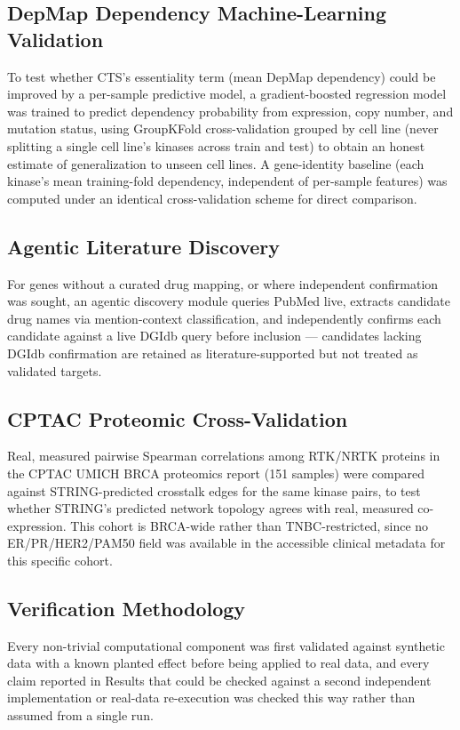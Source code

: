 \documentclass[10pt,letterpaper]{article}
\begin{document}
\subsection*{DepMap Dependency Machine-Learning Validation}
To test whether CTS's essentiality term (mean DepMap dependency) could be improved by a per-sample predictive model, a gradient-boosted regression model was trained to predict dependency probability from expression, copy number, and mutation status, using GroupKFold cross-validation grouped by cell line (never splitting a single cell line's kinases across train and test) to obtain an honest estimate of generalization to unseen cell lines. A gene-identity baseline (each kinase's mean training-fold dependency, independent of per-sample features) was computed under an identical cross-validation scheme for direct comparison.

\subsection*{Agentic Literature Discovery}
For genes without a curated drug mapping, or where independent confirmation was sought, an agentic discovery module queries PubMed live, extracts candidate drug names via mention-context classification, and independently confirms each candidate against a live DGIdb query before inclusion --- candidates lacking DGIdb confirmation are retained as literature-supported but not treated as validated targets.

\subsection*{CPTAC Proteomic Cross-Validation}
Real, measured pairwise Spearman correlations among RTK/NRTK proteins in the CPTAC UMICH BRCA proteomics report (151 samples) were compared against STRING-predicted crosstalk edges for the same kinase pairs, to test whether STRING's predicted network topology agrees with real, measured co-expression. This cohort is BRCA-wide rather than TNBC-restricted, since no ER/PR/HER2/PAM50 field was available in the accessible clinical metadata for this specific cohort.

\subsection*{Verification Methodology}
Every non-trivial computational component was first validated against synthetic data with a known planted effect before being applied to real data, and every claim reported in Results that could be checked against a second independent implementation or real-data re-execution was checked this way rather than assumed from a single run.
\end{document}
